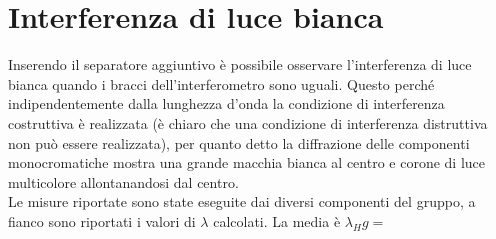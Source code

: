 \documentclass[10pt,a4paper]{article}
\begin{document}
\section{Interferenza di luce bianca}
Inserendo il separatore aggiuntivo è possibile osservare l'interferenza di luce bianca quando i bracci dell'interferometro sono uguali. Questo perché indipendentemente dalla lunghezza d'onda la condizione di interferenza costruttiva è realizzata (è chiaro che una condizione di interferenza distruttiva non può essere realizzata), per quanto detto la diffrazione delle componenti monocromatiche mostra una grande macchia bianca al centro e corone di luce multicolore allontanandosi dal centro.\\ 


Le misure riportate sono state eseguite dai diversi componenti del gruppo, a fianco sono riportati i valori di $\lambda$ calcolati. La media è $\lambda_Hg = $

\end{document}
